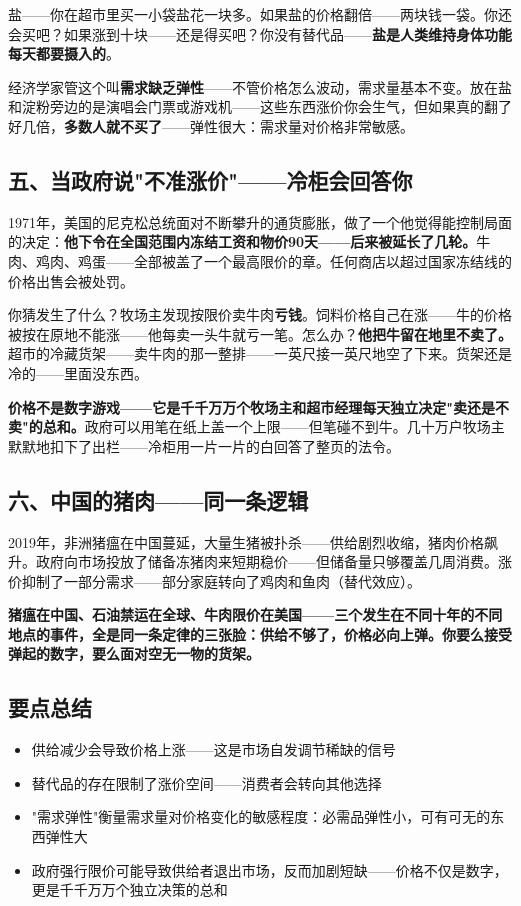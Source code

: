 \documentclass[a4paper,12pt]{ctexart}
\begin{document}
盐——你在超市里买一小袋盐花一块多。如果盐的价格翻倍——两块钱一袋。你还会买吧？如果涨到十块——还是得买吧？你没有替代品——\textbf{盐是人类维持身体功能每天都要摄入的}。

经济学家管这个叫\textbf{需求缺乏弹性}——不管价格怎么波动，需求量基本不变。放在盐和淀粉旁边的是演唱会门票或游戏机——这些东西涨价你会生气，但如果真的翻了好几倍，\textbf{多数人就不买了}——弹性很大：需求量对价格非常敏感。

\subsection*{五、当政府说"不准涨价"——冷柜会回答你}

1971年，美国的尼克松总统面对不断攀升的通货膨胀，做了一个他觉得能控制局面的决定：\textbf{他下令在全国范围内冻结工资和物价90天——后来被延长了几轮。}牛肉、鸡肉、鸡蛋——全部被盖了一个最高限价的章。任何商店以超过国家冻结线的价格出售会被处罚。

你猜发生了什么？牧场主发现按限价卖牛肉\:\textbf{亏钱}。饲料价格自己在涨——牛的价格被按在原地不能涨——他每卖一头牛就亏一笔。怎么办？\textbf{他把牛留在地里不卖了。}超市的冷藏货架——卖牛肉的那一整排——一英尺接一英尺地空了下来。货架还是冷的——里面没东西。

\textbf{价格不是数字游戏——它是千千万万个牧场主和超市经理每天独立决定"卖还是不卖"的总和。}政府可以用笔在纸上盖一个上限——但笔碰不到牛。几十万户牧场主默默地扣下了出栏——冷柜用一片一片的白回答了整页的法令。

\subsection*{六、中国的猪肉——同一条逻辑}\]

2019年，非洲猪瘟在中国蔓延，大量生猪被扑杀——供给剧烈收缩，猪肉价格飙升。政府向市场投放了储备冻猪肉来短期稳价——但储备量只够覆盖几周消费。涨价抑制了一部分需求——部分家庭转向了鸡肉和鱼肉（替代效应）。

\textbf{猪瘟在中国、石油禁运在全球、牛肉限价在美国——三个发生在不同十年的不同地点的事件，全是同一条定律的三张脸：供给不够了，价格必向上弹。你要么接受弹起的数字，要么面对空无一物的货架。}

\subsection*{要点总结}
\begin{itemize}
  \item 供给减少会导致价格上涨——这是市场自发调节稀缺的信号
  \item 替代品的存在限制了涨价空间——消费者会转向其他选择
  \item "需求弹性"衡量需求量对价格变化的敏感程度：必需品弹性小，可有可无的东西弹性大
  \item 政府强行限价可能导致供给者退出市场，反而加剧短缺——价格不仅是数字，更是千千万万个独立决策的总和
\end{itemize}
\end{document}
